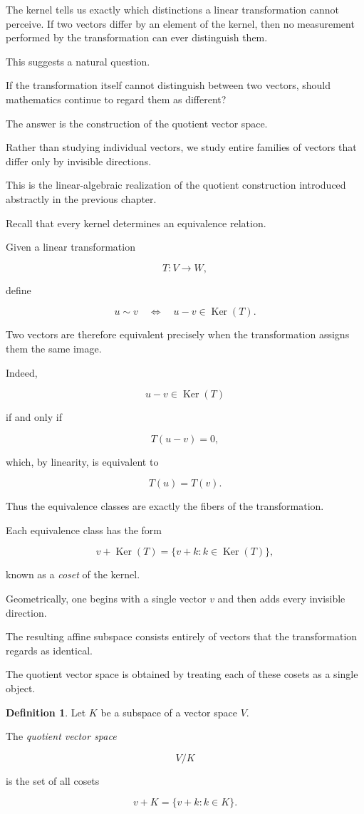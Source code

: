 \documentclass[11pt]{book}
\numberwithin{equation}{chapter}
\theoremstyle{definition}
\newtheorem{definition}{Definition}[chapter]
\theoremstyle{plain}
\theoremstyle{remark}
\DeclareMathOperator{\Ker}{Ker}
\begin{document}
The kernel tells us exactly which distinctions a linear transformation cannot perceive. If two vectors differ by an element of the kernel, then no measurement performed by the transformation can ever distinguish them.

This suggests a natural question.

If the transformation itself cannot distinguish between two vectors, should mathematics continue to regard them as different?

The answer is the construction of the quotient vector space.

Rather than studying individual vectors, we study entire families of vectors that differ only by invisible directions.

This is the linear-algebraic realization of the quotient construction introduced abstractly in the previous chapter.

Recall that every kernel determines an equivalence relation.

Given a linear transformation

\[
T:V\rightarrow W,
\]

define

\[
u\sim v
\quad\Longleftrightarrow\quad
u-v\in\Ker(T).
\]

Two vectors are therefore equivalent precisely when the transformation assigns them the same image.

Indeed,

\[
u-v\in\Ker(T)
\]

if and only if

\[
T(u-v)=0,
\]

which, by linearity, is equivalent to

\[
T(u)=T(v).
\]

Thus the equivalence classes are exactly the fibers of the transformation.

Each equivalence class has the form

\[
v+\Ker(T)
=
\{
v+k:k\in\Ker(T)
\},
\]

known as a \emph{coset} of the kernel.

Geometrically, one begins with a single vector \(v\) and then adds every invisible direction.

The resulting affine subspace consists entirely of vectors that the transformation regards as identical.

The quotient vector space is obtained by treating each of these cosets as a single object.

\begin{definition}
Let \(K\) be a subspace of a vector space \(V\).

The \emph{quotient vector space}

\[
V/K
\]

is the set of all cosets

\[
v+K
=
\{v+k:k\in K\}.
\]
\end{definition}
\end{document}
